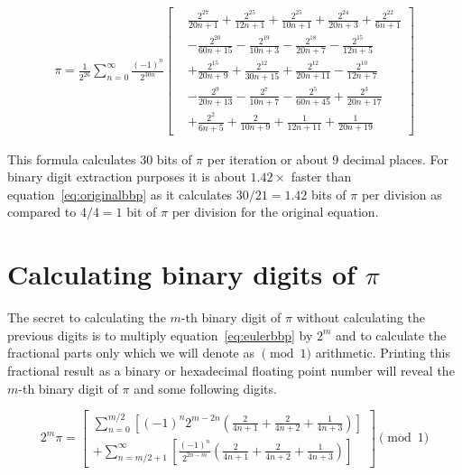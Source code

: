 \documentclass[11pt]{article}
\begin{document}
\begin{equation}
\begin{split}
  \pi
  = \frac{1}{2^{26}} \sum_{n = 0}^\infty \frac{(-1)^n}{2^{30n}} \left[
    \begin{aligned}
    & \frac{2^{27}}{20n+1}
    + \frac{2^{25}}{12n+1}
    + \frac{2^{25}}{10n+1}
    + \frac{2^{24}}{20n+3}
    + \frac{2^{22}}{6n+1} \\
    &- \frac{2^{20}}{60n+15}
    - \frac{2^{19}}{10n+3}
    - \frac{2^{18}}{20n+7}
    - \frac{2^{15}}{12n+5} \\
    &+ \frac{2^{15}}{20n+9}
    + \frac{2^{12}}{30n+15}
    + \frac{2^{12}}{20n+11}
    - \frac{2^{10}}{12n+7} \\
    &- \frac{2^{9}}{20n+13} 
    - \frac{2^{7}}{10n+7}
    - \frac{2^{5}}{60n+45}
    + \frac{2^{3}}{20n+17} \\
    &+ \frac{2^{2}}{6n+5}
    + \frac{2}{10n+9}
    + \frac{1}{12n+11}
    + \frac{1}{20n+19}
    \end{aligned}
  \right]
\end{split}
\end{equation}

\fi                             %

This formula calculates 30 bits of $\pi$ per iteration or about 9 decimal places. For binary digit extraction purposes it is about $1.42\times$ faster than equation~\eqref{eq:originalbbp} as it calculates $30/21 = 1.42$ bits of $\pi$ per division as compared to $4/4 = 1$ bit of $\pi$ per division for the original equation.

\section{Calculating binary digits of $\pi$}

The secret to calculating the $m$-th binary digit of $\pi$ without calculating the previous digits is to multiply equation~\eqref{eq:eulerbbp} by $2^m$ and to calculate the fractional parts only which we will denote as $\pmod 1$ arithmetic. Printing this fractional result as a binary or hexadecimal floating point number will reveal the $m$-th binary digit of $\pi$ and some following digits.

\begin{equation}
  2^m \pi = \left[
    \begin{aligned}
      \sum_{n = 0}^{m/2} \left[ (-1)^n 2^{m-2n} \left( \frac{2}{4n + 1} + \frac{2}{4n + 2} + \frac{1}{4n + 3} \right) \right] \\
      + \sum_{n = m/2+1}^\infty \left[ \frac{(-1)^n}{2^{2n-m}} \left( \frac{2}{4n + 1} + \frac{2}{4n + 2} + \frac{1}{4n + 3} \right) \right]
    \end{aligned}
    \right] \pmod 1
\end{equation}
\end{document}
